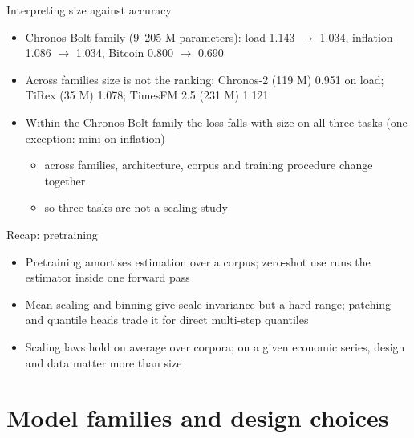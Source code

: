 \begin{frame}{Interpreting size against accuracy}
\itemsize{\small}
\begin{itemize}
    \item Chronos-Bolt family (9--205 M parameters): load 1.143 $\to$ 1.034, inflation 1.086 $\to$ 1.034, Bitcoin 0.800 $\to$ 0.690
    \item Across families size is not the ranking: Chronos-2 (119 M) 0.951 on load; TiRex (35 M) 1.078; TimesFM 2.5 (231 M) 1.121
    \item Within the Chronos-Bolt family the loss falls with size on all three tasks (one exception: mini on inflation)
    \begin{itemize}
        \item across families, architecture, corpus and training procedure change together
        \item so three tasks are not a scaling study
    \end{itemize}
\end{itemize}
\end{frame}

\begin{frame}{Recap: pretraining}
\itemsize{\small}
\begin{itemize}
    \item Pretraining amortises estimation over a corpus; zero-shot use runs the estimator inside one forward pass
    \item Mean scaling and binning give scale invariance but a hard range; patching and quantile heads trade it for direct multi-step quantiles
    \item Scaling laws hold on average over corpora; on a given economic series, design and data matter more than size
\end{itemize}
\end{frame}


\section{Model families and design choices}

